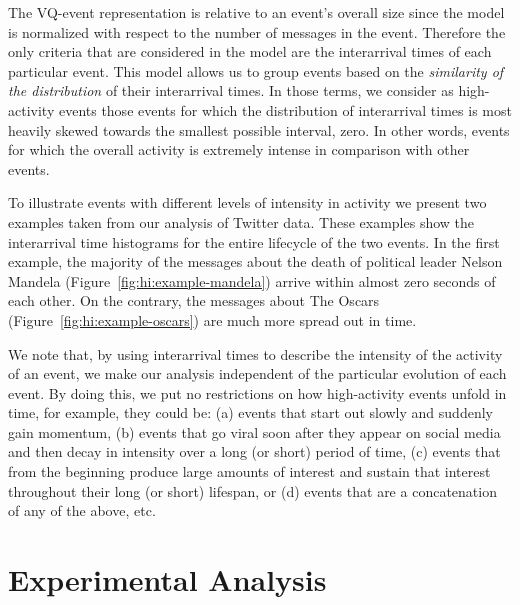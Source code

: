 The VQ-event representation is relative to an event's overall size since the
model is normalized with respect to the number of messages in the event.
%
Therefore the only criteria that are considered in the model are the
interarrival times of each particular event. 
%
This model allows us to group events based on the {\em similarity of the
distribution} of their interarrival times. 
%
In those terms, we consider as high-activity events those events for which the
distribution of interarrival times is most heavily skewed towards the smallest
possible interval, zero. 
%
In other words, events for which the overall activity is extremely intense in
comparison with other events.


To illustrate events with different levels of intensity in activity we present
two examples taken from our analysis of Twitter data. 
%
These examples show the interarrival time histograms for the entire lifecycle of
the two events. 
%
In the first example, the majority of the messages about the death of political
leader Nelson Mandela (Figure~\ref{fig:hi:example-mandela}) arrive within almost
zero seconds of each other. 
%
On the contrary, the messages about The Oscars
(Figure~\ref{fig:hi:example-oscars}) are much more spread out in time.


We note that, by using interarrival times to describe the intensity of the
activity of an event, we make our analysis independent of the particular
evolution of each event. 
%
By doing this, we put no restrictions on how high-activity events unfold in
time, for example, they could be: 
%
(a) events that start out slowly and suddenly gain momentum, 
%
(b) events that go viral soon after they appear on social media and then decay
in intensity over a long (or short) period of time, 
%
(c) events that from the beginning produce large amounts of interest and sustain
that interest throughout their long (or short) lifespan, or 
%
(d) events that are a concatenation of any of the above, etc.






\section{Experimental Analysis}

